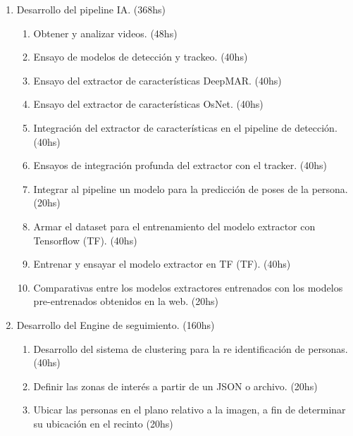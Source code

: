 \documentclass[11pt]{charter}
\begin{document}
\begin{enumerate}
\item Desarrollo del pipeline IA. (368hs)
	\begin{enumerate}
	\item Obtener y analizar videos. (48hs)
	\item Ensayo de modelos de detección y trackeo. (40hs)
	\item Ensayo del extractor de características DeepMAR. (40hs)
	\item Ensayo del extractor de características OsNet. (40hs)
	\item Integración del extractor de características en el pipeline de detección. (40hs)
	\item Ensayos de integración profunda del extractor con el tracker. (40hs)
	\item Integrar al pipeline un modelo para la predicción de poses de la persona. (20hs)
	\item Armar el dataset para el entrenamiento del modelo extractor con Tensorflow (TF). (40hs)
	\item Entrenar y ensayar el modelo extractor en TF (TF). (40hs)
	\item Comparativas entre los modelos extractores entrenados con los modelos pre-entrenados obtenidos en la web. (20hs)	
	\end{enumerate}
\item Desarrollo del Engine de seguimiento. (160hs)
	\begin{enumerate}
	\item Desarrollo del sistema de clustering para la re identificación de personas. (40hs)
	\item Definir las zonas de interés a partir de un JSON o archivo. (20hs)
	\item Ubicar las personas en el plano relativo a la imagen, a fin de determinar su ubicación en el recinto (20hs)
	

\end{enumerate}
\end{enumerate}
\end{document}
